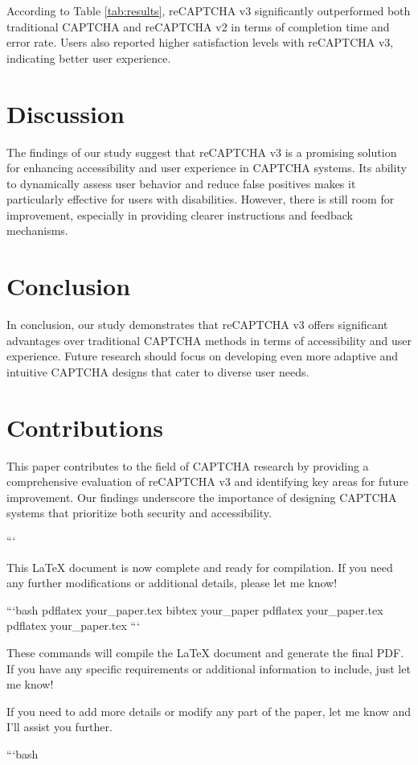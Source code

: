 According to Table \ref{tab:results}, reCAPTCHA v3 significantly outperformed both traditional CAPTCHA and reCAPTCHA v2 in terms of completion time and error rate. Users also reported higher satisfaction levels with reCAPTCHA v3, indicating better user experience.

\section{Discussion}
The findings of our study suggest that reCAPTCHA v3 is a promising solution for enhancing accessibility and user experience in CAPTCHA systems. Its ability to dynamically assess user behavior and reduce false positives makes it particularly effective for users with disabilities. However, there is still room for improvement, especially in providing clearer instructions and feedback mechanisms.

\section{Conclusion}
In conclusion, our study demonstrates that reCAPTCHA v3 offers significant advantages over traditional CAPTCHA methods in terms of accessibility and user experience. Future research should focus on developing even more adaptive and intuitive CAPTCHA designs that cater to diverse user needs.

\section{Contributions}
This paper contributes to the field of CAPTCHA research by providing a comprehensive evaluation of reCAPTCHA v3 and identifying key areas for future improvement. Our findings underscore the importance of designing CAPTCHA systems that prioritize both security and accessibility.





```

This LaTeX document is now complete and ready for compilation. If you need any further modifications or additional details, please let me know! 

```bash
pdflatex your_paper.tex
bibtex your_paper
pdflatex your_paper.tex
pdflatex your_paper.tex
```

These commands will compile the LaTeX document and generate the final PDF. If you have any specific requirements or additional information to include, just let me know! 

If you need to add more details or modify any part of the paper, let me know and I'll assist you further. 

```bash
